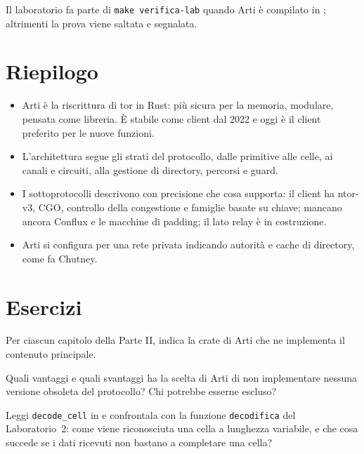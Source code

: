 Il laboratorio fa parte di \texttt{make verifica-lab} quando Arti è compilato in ; altrimenti la prova viene saltata e segnalata.

\section*{Riepilogo}
\begin{itemize}
  \item Arti è la riscrittura di tor in Rust: più sicura per la memoria, modulare, pensata come libreria. È stabile come client dal 2022 e oggi è il client preferito per le nuove funzioni.
  \item L'architettura segue gli strati del protocollo, dalle primitive alle celle, ai canali e circuiti, alla gestione di directory, percorsi e guard.
  \item I sottoprotocolli descrivono con precisione che cosa supporta: il client ha ntor-v3, CGO, controllo della congestione e famiglie basate su chiave; mancano ancora Conflux e le macchine di padding; il lato relay è in costruzione.
  \item Arti si configura per una rete privata indicando autorità e cache di directory, come fa Chutney.
\end{itemize}

\section*{Esercizi}

\begin{esercizio}[1]\label{es:30-crate}
Per ciascun capitolo della Parte II, indica la crate di Arti che ne implementa il contenuto principale.
\end{esercizio}

\begin{esercizio}[1]\label{es:30-obsoleto}
Quali vantaggi e quali svantaggi ha la scelta di Arti di non implementare nessuna versione obsoleta del protocollo? Chi potrebbe esserne escluso?
\end{esercizio}

\begin{esercizio}[2]\label{es:30-cella}
Leggi \texttt{decode\_cell} in  e confrontala con la funzione \texttt{decodifica} del Laboratorio~2: come viene riconosciuta una cella a lunghezza variabile, e che cosa succede se i dati ricevuti non bastano a completare una cella?
\end{esercizio}

